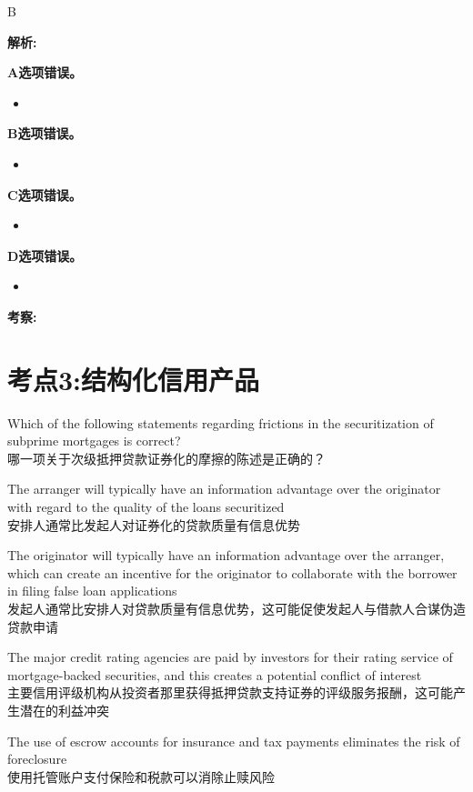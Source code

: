 \documentclass{article}
\newcounter{question} %
\newenvironment{explanation}
{\textbf{解析:}\par}
{\par}
\newcommand{\checklist}[1]{
    \textbf{考察:} #1 \par %
    \addcontentsline{toc}{subsection}{题号\thequestion 考察: #1} %
    \vspace{2em} %
}
\begin{document}
\begin{choices}
    \item 
\end{choices}

\begin{correctanswer}
    B
\end{correctanswer}

\begin{explanation}
    \textbf{A选项错误。}
    \begin{itemize}
        \item 
    \end{itemize}
    \textbf{B选项错误。}
    \begin{itemize}
        \item 
    \end{itemize}
    \textbf{C选项错误。}
    \begin{itemize}
        \item 
    \end{itemize}
    \textbf{D选项错误。}
    \begin{itemize}
        \item 
    \end{itemize}
\end{explanation}
\checklist{}




\newpage


\section{考点3:结构化信用产品}
\setcounter{question}{0}
\begin{question}
    Which of the following statements regarding frictions in the securitization of subprime mortgages is correct?
    \\ 哪一项关于次级抵押贷款证券化的摩擦的陈述是正确的？
\end{question}

\begin{choices}
    \item The arranger will typically have an information advantage over the originator with regard to the quality of the loans securitized\\
    安排人通常比发起人对证券化的贷款质量有信息优势
    \item The originator will typically have an information advantage over the arranger, which can create an incentive for the originator to collaborate with the borrower in filing false loan applications\\
    发起人通常比安排人对贷款质量有信息优势，这可能促使发起人与借款人合谋伪造贷款申请
    \item The major credit rating agencies are paid by investors for their rating service of mortgage-backed securities, and this creates a potential conflict of interest\\
    主要信用评级机构从投资者那里获得抵押贷款支持证券的评级服务报酬，这可能产生潜在的利益冲突
    \item The use of escrow accounts for insurance and tax payments eliminates the risk of foreclosure\\
    使用托管账户支付保险和税款可以消除止赎风险
\end{choices}
\end{document}
